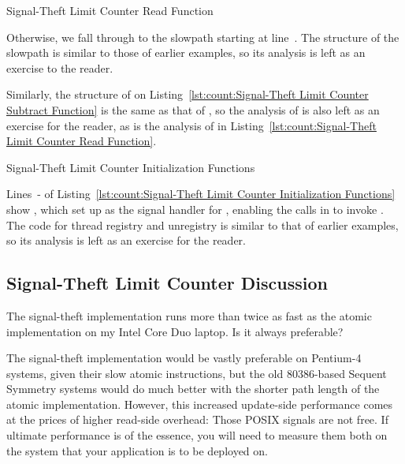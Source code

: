 \begin{listing}[tbp]

\caption{Signal-Theft Limit Counter Read Function}
\label{lst:count:Signal-Theft Limit Counter Read Function}
\end{listing}

\begin{lineref}
Otherwise, we fall through to the slowpath starting at line~.
The structure of the slowpath is similar to those of earlier examples,
so its analysis is left as an exercise to the reader.
\end{lineref}
Similarly, the structure of  on
Listing~\ref{lst:count:Signal-Theft Limit Counter Subtract Function}
is the same
as that of , so the analysis of  is also
left as an exercise for the reader, as is the analysis of
 in
Listing~\ref{lst:count:Signal-Theft Limit Counter Read Function}.

\begin{listing}[tbp]

\caption{Signal-Theft Limit Counter Initialization Functions}
\label{lst:count:Signal-Theft Limit Counter Initialization Functions}
\end{listing}

\begin{lineref}
Lines~- of
Listing~\ref{lst:count:Signal-Theft Limit Counter Initialization Functions}
show , which set up 
as the signal handler for ,
enabling the  calls in 
to invoke .
The code for thread registry and unregistry is similar to that of
earlier examples, so its analysis is left as an exercise for the
reader.
\end{lineref}

\subsection{Signal-Theft Limit Counter Discussion}

The signal-theft implementation runs more than twice as fast as the
atomic implementation on my Intel Core Duo laptop.
Is it always preferable?

The signal-theft implementation would be vastly preferable on Pentium-4
systems, given their slow atomic instructions, but the old 80386-based
Sequent Symmetry systems would do much better with the shorter path
length of the atomic implementation.
However, this increased update-side performance comes at the
prices of higher read-side overhead: Those POSIX signals are not free.
If ultimate performance is of the essence, you will need to measure
them both on the system that your application is to be deployed on.

